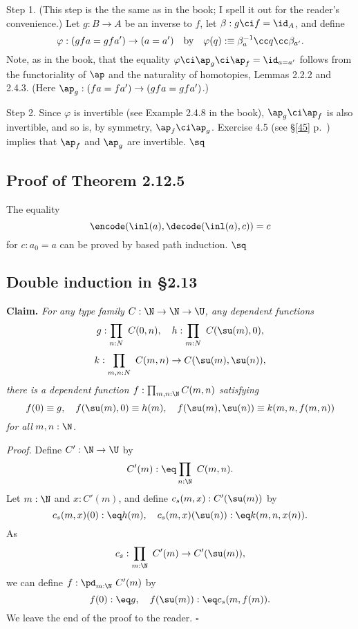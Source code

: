 \documentclass[12pt]{article}
\begin{document}
Step 1. (This step is the the same as in the book; I spell it out for the reader's convenience.) Let $g:B\to A$ be an inverse to $f$, let $\beta:g\ci f=\id_A$, and define 
$$
\varphi:(gfa=gfa')\to(a=a')\quad\text{by}\quad\varphi(q):\equiv\beta_a^{-1}\cc q\cc\beta_{a'}.
$$ 
Note, as in the book, that the equality $\varphi\ci\ap_g\ci\ap_f=\id_{a=a'}$ follows from the functoriality of $\ap$ and the naturality of homotopies, Lemmas 2.2.2 and 2.4.3. (Here $\ap_g:(fa=fa')\to (gfa=gfa')$.)

Step 2. Since $\varphi$ is invertible (see Example 2.4.8 in the book), $\ap_g\ci\ap_f$ is also invertible, and so is, by symmetry, $\ap_f\ci\ap_g$. Exercise 4.5 (see \S\ref{45} p.~\pageref{45}) implies that $\ap_f$ and $\ap_g$ are invertible. $\sq$


\subsection{Proof of Theorem 2.12.5}

The equality 
$$
\encode(\inl(a),\decode(\inl(a),c))=c
$$ 
for $c:a_0=a$ can be proved by based path induction. $\sq$



\subsection{Double induction in \S2.13}

\nn\textbf{Claim.} \emph{For any type family $C:\N\to\N\to\U$, any dependent functions}
$$
g:\prod_{n:N}\ C(0,n),\quad h:\prod_{m:N}\ C(\su(m),0),
$$
$$
k:\prod_{m,n:N}\ C(m,n)\to C(\su(m),\su(n)),
$$ 
\emph{there is a dependent function $f:\prod_{m,n:\N}C(m,n)$ satisfying}
$$
f(0)\equiv g,\quad f(\su(m),0)\equiv h(m),\quad f(\su(m),\su(n))\equiv k(m,n,f(m,n))
$$ 
\emph{for all} $m,n:\N$.

\nn\emph{Proof.} Define $C':\N\to\U$ by 
$$
C'(m):\eq\prod_{n:\N}\ C(m,n).
$$ 
Let $m:\N$ and $x:C'(m)$, and define $c_s(m,x):C'(\su(m))$ by 
$$
c_s(m,x)(0):\eq h(m),\quad c_s(m,x)(\su(n)):\eq k(m,n,x(n)).
$$ 
As  
$$
c_s:\prod_{m:\N}\ C'(m)\to C'(\su(m)),
$$ 
we can define $f:\pd_{m:\N}\ C'(m)$ by 
$$
f(0):\eq g,\quad f(\su(m)):\eq c_s(m,f(m)).
$$ 
We leave the end of the proof to the reader. $\square$

\end{document}
